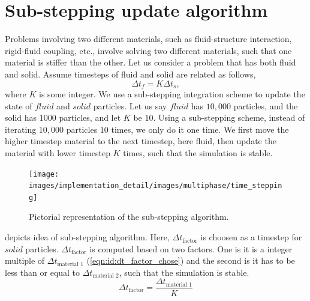 \section{Sub-stepping update algorithm}
\label{sec:substepping-algorithm}
Problems involving two different materials, such as fluid-structure interaction,
rigid-fluid coupling, etc., involve solving two different materials, such that
one material is stiffer than the other. Let us consider a problem that has both
fluid and solid. Assume timesteps of fluid and solid are related as follows,
\begin{equation}
\Delta t_f = K \Delta t_s,
\end{equation}
where $K$ is some integer. We use a sub-stepping integration scheme to update
the state of $fluid$ and $solid$ particles. Let us say $fluid$ has $10,000$
particles, and the solid has $1000$ particles, and let $K$ be $10$. Using a
sub-stepping scheme, instead of iterating $10,000$ particles $10$ times, we only
do it one time. We first move the higher timestep material to the next timestep,
here fluid, then update the material with lower timestep $K$ times, such that
the simulation is stable.
\begin{figure}[!htpb]
  \centering
  \texttt{[image: images/implementation\_detail/images/multiphase/time\_stepping]}
  \caption{Pictorial representation of the sub-stepping algorithm.}
\label{fig:id:multiphase}
\end{figure}
 depicts idea of sub-stepping algorithm. Here,
$\Delta t_{\text{factor}}$ is choosen as a timestep for $solid$ particles.
$\Delta t_{\text{factor}}$ is computed based on two factors. One is it is a
integer multiple of $\Delta t_{\text{material 1}}$
(\cref{eqn:id:dt_factor_chose}) and the second is it has to be less than or
equal to $\Delta t_{\text{material 2}}$, such that the simulation is stable.
\begin{equation}
\label{eqn:id:dt_factor_chose}
\Delta t_{\text{factor}} = \frac{\Delta t_{\text{material 1}}}{K}
\end{equation}


\FloatBarrier%
